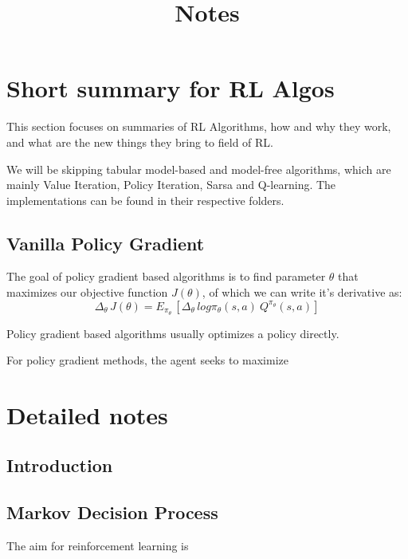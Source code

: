 \documentclass[12pt]{article} %
\title{Notes}
\author{}
\date{}
\begin{document}
\maketitle

\tableofcontents

\newpage

\section{Short summary for RL Algos}
This section focuses on summaries of RL Algorithms, how and why they work, and what are the new things they bring to field of RL.

We will be skipping tabular model-based and model-free algorithms, which are mainly Value Iteration, Policy Iteration, Sarsa and Q-learning. The implementations can be found in their respective folders.
\subsection{Vanilla Policy Gradient}
The goal of policy gradient based algorithms is to find parameter $\theta$ that maximizes our objective function $J(\theta)$, of which we can write it's derivative as:
\begin{equation}
    \Delta_\theta\, J(\theta) = E_{\pi_\theta}\,[\Delta_\theta\,log \pi_\theta(s,a)\: Q^{\pi_\theta}(s,a)]
\end{equation}

Policy gradient based algorithms usually optimizes a policy directly.

For policy gradient methods, the agent seeks to maximize 
\section{Detailed notes}
\subsection{Introduction}
\subsection{Markov Decision Process}
The aim for reinforcement learning is 
\end{document}
